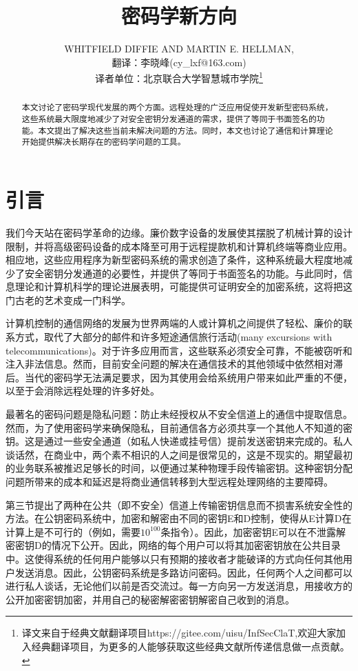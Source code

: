 \documentclass[]{article}
\title{密码学新方向}
\author{WHITFIELD DIFFIE AND MARTIN E. HELLMAN, \\
{\small  翻译：李晓峰(cy\_lxf@163.com)}\\
{\small 译者单位：北京联合大学智慧城市学院}\footnote{译文来自于经典文献翻译项目https://gitee.com/uisu/InfSecClaT,欢迎大家加入经典翻译项目，为更多的人能够获取这些经典文献所传递信息做一点贡献。}
}
\begin{document}
	
	\maketitle
	
	\begin{abstract}
		本文讨论了密码学现代发展的两个方面。远程处理的广泛应用促使开发新型密码系统，这些系统最大限度地减少了对安全密钥分发通道的需求，提供了等同于书面签名的功能。本文提出了解决这些当前未解决问题的方法。同时，本文也讨论了通信和计算理论开始提供解决长期存在的密码学问题的工具。
	\end{abstract}

	\section{引言}
	我们今天站在密码学革命的边缘。廉价数字设备的发展使其摆脱了机械计算的设计限制，并将高级密码设备的成本降至可用于远程提款机和计算机终端等商业应用。相应地，这些应用程序为新型密码系统的需求创造了条件，这种系统最大程度地减少了安全密钥分发通道的必要性，并提供了等同于书面签名的功能。与此同时，信息理论和计算机科学的理论进展表明，可能提供可证明安全的加密系统，这将把这门古老的艺术变成一门科学。
	
	计算机控制的通信网络的发展为世界两端的人或计算机之间提供了轻松、廉价的联系方式，取代了大部分的邮件和许多短途通信旅行活动(many excursions with telecommunications)。对于许多应用而言，这些联系必须安全可靠，不能被窃听和注入非法信息。然而，目前安全问题的解决在通信技术的其他领域中依然相对滞后。当代的密码学无法满足要求，因为其使用会给系统用户带来如此严重的不便，以至于会消除远程处理的许多好处。
	
	最著名的密码问题是隐私问题：防止未经授权从不安全信道上的通信中提取信息。然而，为了使用密码学来确保隐私，目前通信各方必须共享一个其他人不知道的密钥。这是通过一些安全通道（如私人快递或挂号信）提前发送密钥来完成的。私人谈话然，在商业中，两个素不相识的人之间是很常见的，这是不现实的。期望最初的业务联系被推迟足够长的时间，以便通过某种物理手段传输密钥。这种密钥分配问题所带来的成本和延迟是将商业通信转移到大型远程处理网络的主要障碍。
	
	第三节提出了两种在公共（即不安全）信道上传输密钥信息而不损害系统安全性的方法。在公钥密码系统中，加密和解密由不同的密钥E和D控制，使得从E计算D在计算上是不可行的（例如，需要$10^{100}$条指令）。因此，加密密钥E可以在不泄露解密密钥D的情况下公开。因此，网络的每个用户可以将其加密密钥放在公共目录中。这使得系统的任何用户能够以只有预期的接收者才能破译的方式向任何其他用户发送消息。因此，公钥密码系统是多路访问密码。因此，任何两个人之间都可以进行私人谈话，无论他们以前是否交流过。每一方向另一方发送消息，用接收方的公开加密密钥加密，并用自己的秘密解密密钥解密自己收到的消息。
	
\end{document}
